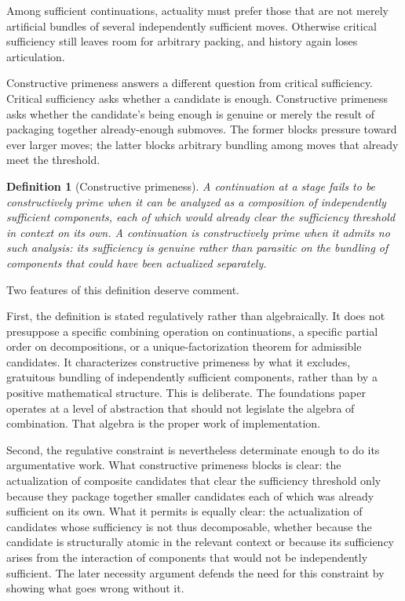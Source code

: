 \documentclass[11pt]{article}
\theoremstyle{foundation}
\newtheorem{definition}{Definition}
\begin{document}
Among sufficient continuations, actuality must prefer those that are not merely artificial bundles of several independently sufficient moves. Otherwise critical sufficiency still leaves room for arbitrary packing, and history again loses articulation.

Constructive primeness answers a different question from critical sufficiency. Critical sufficiency asks whether a candidate is enough. Constructive primeness asks whether the candidate's being enough is genuine or merely the result of packaging together already-enough submoves. The former blocks pressure toward ever larger moves; the latter blocks arbitrary bundling among moves that already meet the threshold.

\begin{definition}[Constructive primeness]
A continuation at a stage fails to be constructively prime when it can be analyzed as a composition of independently sufficient components, each of which would already clear the sufficiency threshold in context on its own. A continuation is constructively prime when it admits no such analysis: its sufficiency is genuine rather than parasitic on the bundling of components that could have been actualized separately.
\end{definition}

Two features of this definition deserve comment.

First, the definition is stated regulatively rather than algebraically. It does not presuppose a specific combining operation on continuations, a specific partial order on decompositions, or a unique-factorization theorem for admissible candidates. It characterizes constructive primeness by what it excludes, gratuitous bundling of independently sufficient components, rather than by a positive mathematical structure. This is deliberate. The foundations paper operates at a level of abstraction that should not legislate the algebra of combination. That algebra is the proper work of implementation.

Second, the regulative constraint is nevertheless determinate enough to do its argumentative work. What constructive primeness blocks is clear: the actualization of composite candidates that clear the sufficiency threshold only because they package together smaller candidates each of which was already sufficient on its own. What it permits is equally clear: the actualization of candidates whose sufficiency is not thus decomposable, whether because the candidate is structurally atomic in the relevant context or because its sufficiency arises from the interaction of components that would not be independently sufficient. The later necessity argument defends the need for this constraint by showing what goes wrong without it.
\end{document}
